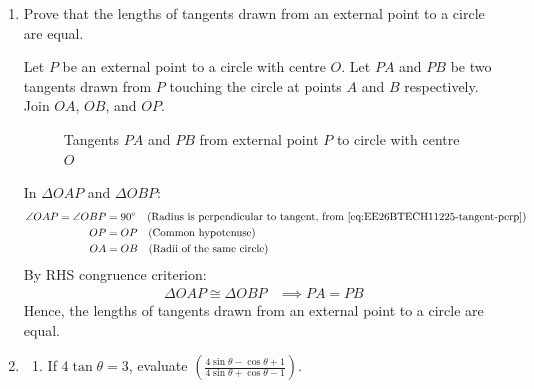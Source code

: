 \begin{enumerate}[label=\thesubsection.\arabic*, ref=\thesubsection.\theenumi]
From \eqref{eq:EE26BTECH11225-area-ratio} (area ratio theorem for similar triangles):
\begin{align}
    \frac{\text{Area}(\Delta ABC)}{\text{Area}(\Delta PQR)} &= \left(\frac{AB}{PQ}\right)^2 = \left(\frac{BC}{QR}\right)^2 = \left(\frac{AC}{PR}\right)^2
\end{align}

Since $\text{Area}(\Delta ABC) = \text{Area}(\Delta PQR)$, the ratio of their areas is $1$:
\begin{align}
    1 = \left(\frac{AB}{PQ}\right)^2 &\implies \frac{AB}{PQ} = 1 \implies AB = PQ \\
    1 = \left(\frac{BC}{QR}\right)^2 &\implies \frac{BC}{QR} = 1 \implies BC = QR \\
    1 = \left(\frac{AC}{PR}\right)^2 &\implies \frac{AC}{PR} = 1 \implies AC = PR
\end{align}

Since all three corresponding sides are equal ($AB = PQ$, $BC = QR$, $AC = PR$), by SSS congruence criterion:
\begin{align}
    \Delta ABC \cong \Delta PQR
\end{align}
Hence proved.
    \item Prove that the lengths of tangents drawn from an external point to a circle are equal.

\solution Let $P$ be an external point to a circle with centre $O$. Let $PA$ and $PB$ be two tangents drawn from $P$ touching the circle at points $A$ and $B$ respectively. Join $OA$, $OB$, and $OP$.

\begin{figure}[H]
    \centering
    
    \caption{Tangents $PA$ and $PB$ from external point $P$ to circle with centre $O$}
    \label{fig:tangents_circle}
\end{figure}

In $\Delta OAP$ and $\Delta OBP$:
\begin{align}
    \angle OAP = \angle OBP &= 90^\circ \quad (\text{Radius is perpendicular to tangent, from } \eqref{eq:EE26BTECH11225-tangent-perp}) \\
    OP &= OP \quad (\text{Common hypotenuse}) \\
    OA &= OB \quad (\text{Radii of the same circle})
\end{align}
By RHS congruence criterion:
\begin{align}
    \Delta OAP \cong \Delta OBP &\implies PA = PB
\end{align}
Hence, the lengths of tangents drawn from an external point to a circle are equal.
    \item 
    \begin{enumerate}[label=(\alph*), leftmargin=1.5em, labelsep=0.5em]
        \item If $4 \tan\theta = 3$, evaluate $\left( \frac{4 \sin\theta - \cos\theta + 1}{4 \sin\theta + \cos\theta - 1} \right)$.
        

\end{enumerate}
\end{enumerate}
